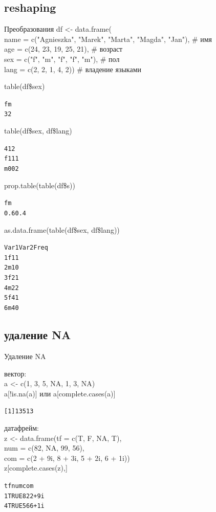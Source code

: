 \subsection{reshaping}
\begin{frame}[fragile]{Преобразования}
df <- data.frame(\\
name = c("Agnieszka"{}, "Marek"{}, "Marta"{}, "Magda"{}, "Jan"), \hfill \# имя\\
age = c(24, 23, 19, 25, 21), \hfill \# возраст\\
sex = c("f"{}, "m"{}, "f"{}, "f"{}, "m"), \hfill \# пол\\
lang = c(2, 2, 1, 4, 2)) \hfill \# владение языками\\
\begin{multicols}{3}
table(df\$sex)\\
\footnotesize
\begin{alltt}
f m 
3 2 
\end{alltt}
\normalsize
table(df\$sex, df\$lang)
\footnotesize
\begin{alltt}
       4   1   2
  f    1   1   1
  m  0   0   2
\end{alltt}
\normalsize
prop.table(table(df\$s))\\
\footnotesize
\begin{alltt}
   f     m 
0.6  0.4 
\end{alltt}
\normalsize
\end{multicols}
as.data.frame(table(df\$sex, df\$lang))
\footnotesize
\begin{alltt}
  Var1 Var2 Freq
1    f       1       1
2    m     1       0
3    f       2       1
4    m     2       2
5    f       4       1
6    m     4       0
\end{alltt}
\normalsize
\end{frame}
\subsection{удаление NA}
\begin{frame}[fragile]{Удаление NA}
\begin{itemize}
\mytem вектор:\\
a <- c(1, 3, 5, NA, 1, 3, NA)\\
a[!is.na(a)] или a[complete.cases(a)]\\
\footnotesize
\begin{alltt}
[1] 1 3 5 1 3
\end{alltt}
\normalsize
\vfill
\mytem датафрейм:\\
z <- data.frame(tf = c(T, F, NA, T),\\
num = c(82, NA, 99, 56),\\
com = c(2 + 9i, 8 + 3i, 5 + 2i, 6 + 1i))\\
z[complete.cases(z),]\\
\footnotesize
\begin{alltt}
    tf num  com
1 TRUE  82 2+9i
4 TRUE  56 6+1i
\end{alltt}
\normalsize
\end{itemize}
\end{frame}
